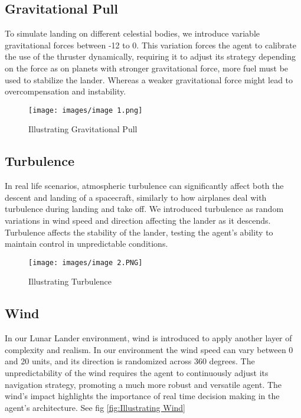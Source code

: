 \documentclass[conference]{IEEEtran}
\begin{document}
\subsection{Gravitational Pull}
To simulate landing on different celestial bodies, we introduce variable gravitational forces between -12 to 0. This variation forces the agent to calibrate the use of the thruster dynamically, requiring it to adjust its strategy depending on the force as on planets with stronger gravitational force, more fuel must be used to stabilize the lander. Whereas a weaker gravitational force might lead to overcompensation and instability.

\begin{figure}[htp]
    \centering
    \texttt{[image: images/image 1.png]}
    \caption{Illustrating Gravitational Pull}
    \label{Illustrating Gravitational Pull}
\end{figure}

\subsection{Turbulence}
In real life scenarios, atmospheric turbulence can significantly affect both the descent and landing of a spacecraft, similarly to how airplanes deal with turbulence during landing and take off. We introduced turbulence as random variations in wind speed and direction affecting the lander as it descends. Turbulence affects the stability of the lander, testing the agent’s ability to maintain control in unpredictable conditions.

\begin{figure}[htp]
    \centering
    \texttt{[image: images/image 2.PNG]}
    \caption{Illustrating Turbulence}
    \label{fIllustrating Turbulence}
\end{figure}


\subsection{Wind}
In our Lunar Lander environment, wind is introduced to apply another layer of complexity and realism. In our environment the wind speed can vary between 0 and 20 units, and its direction is randomized across 360 degrees. The unpredictability of the wind requires the agent to continuously adjust its navigation strategy, promoting a much more robust and versatile agent. The wind’s impact highlights the importance of real time decision making in the agent's architecture. See fig \ref{fig:Illustrating Wind}
\end{document}
